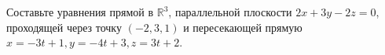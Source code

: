 \documentclass[a4paper, 12pt]{article}
\begin{document}
\begin{spacing}{1}
\begin{center}
\end{center}

\noindent Составьте уравнения прямой в $\mathbb{R}^3$, параллельной плоскости $2x+3y-2z=0$, проходящей через точку $(-2,3,1)$ и пересекающей прямую $x = -3t+1, y=-4t+3,z=3t+2$.



\end{spacing}
\end{document}
